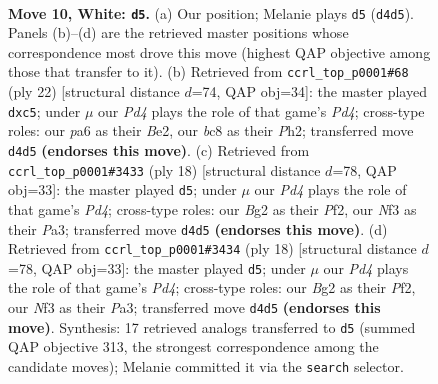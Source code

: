 \documentclass[11pt]{article}
\begin{document}
\clearpage

\begin{figure}[p]\centering
\begin{subfigure}{0.46\textwidth}\centering
\resizebox{\linewidth}{!}{%
\newchessgame
\chessboard[
  setfen={r1b2r1k/1pppqppp/p1n1pn2/8/2PP4/2B1PNP1/PP3PBP/R2QK2R w KQ - 0 10},
  showmover=false,
  pgfstyle=straightmove, color=movearrow, markmove={d4-d5}
]}
\caption{}
\end{subfigure}\hfill
\begin{subfigure}{0.46\textwidth}\centering
\resizebox{\linewidth}{!}{%
\newchessgame
\chessboard[
  setfen={r1b2rk1/p1q2ppp/1pn1pn2/2p5/3P4/P1P1PN2/1B2BPPP/R2QK2R w KQ - 2 12},
  showmover=false,
  pgfstyle=straightmove, color=movearrow, markmove={d4-c5}
]}
\caption{}
\end{subfigure}
\\[4pt]
\begin{subfigure}{0.46\textwidth}\centering
\resizebox{\linewidth}{!}{%
\newchessgame
\chessboard[
  setfen={r1b2rk1/ppp1qppp/2np1n2/4p3/2PP4/P1BBPN2/1P3PPP/R2QK2R w KQ - 0 10},
  showmover=false,
  pgfstyle=straightmove, color=movearrow, markmove={d4-d5}
]}
\caption{}
\end{subfigure}\hfill
\begin{subfigure}{0.46\textwidth}\centering
\resizebox{\linewidth}{!}{%
\newchessgame
\chessboard[
  setfen={r1b2rk1/ppp1qppp/2np1n2/4p3/2PP4/P1BBPN2/1P3PPP/R2QK2R w KQ - 0 10},
  showmover=false,
  pgfstyle=straightmove, color=movearrow, markmove={d4-d5}
]}
\caption{}
\end{subfigure}
\caption{\textbf{Move 10, White: \texttt{d5}.} (a) Our position; Melanie plays \texttt{d5} (\texttt{d4d5}). Panels (b)--(d) are the retrieved master positions whose correspondence most drove this move (highest QAP objective among those that transfer to it). (b) Retrieved from \texttt{ccrl\_top\_p0001\#68} (ply 22) [structural distance $d$=74, QAP obj=34]: the master played \texttt{dxc5}; under $\mu$ our \emph{Pd4} plays the role of that game's \emph{Pd4}; cross-type roles: our \emph{p}a6 as their \emph{B}e2, our \emph{b}c8 as their \emph{P}h2; transferred move \texttt{d4d5} \textbf{(endorses this move)}. (c) Retrieved from \texttt{ccrl\_top\_p0001\#3433} (ply 18) [structural distance $d$=78, QAP obj=33]: the master played \texttt{d5}; under $\mu$ our \emph{Pd4} plays the role of that game's \emph{Pd4}; cross-type roles: our \emph{B}g2 as their \emph{P}f2, our \emph{N}f3 as their \emph{P}a3; transferred move \texttt{d4d5} \textbf{(endorses this move)}. (d) Retrieved from \texttt{ccrl\_top\_p0001\#3434} (ply 18) [structural distance $d$=78, QAP obj=33]: the master played \texttt{d5}; under $\mu$ our \emph{Pd4} plays the role of that game's \emph{Pd4}; cross-type roles: our \emph{B}g2 as their \emph{P}f2, our \emph{N}f3 as their \emph{P}a3; transferred move \texttt{d4d5} \textbf{(endorses this move)}. Synthesis: 17 retrieved analogs transferred to \texttt{d5} (summed QAP objective 313, the strongest correspondence among the candidate moves); Melanie committed it via the \texttt{search} selector.}
\label{fig:thought-m18}
\end{figure}
\end{document}
